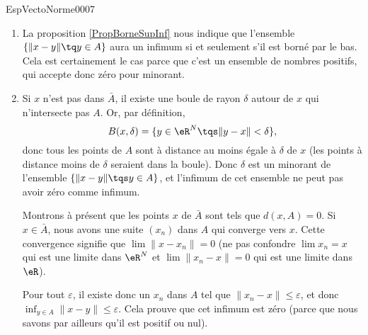 \begin{corrige}{EspVectoNorme0007}

	\begin{enumerate}
		\item
			La proposition \ref{PropBorneSupInf} nous indique que l'ensemble $\{ \| x-y \|\tq
            y\in A \}$ aura un infimum si et seulement s'il est borné par le bas. Cela est certainement le cas parce que c'est un ensemble de nombres positifs, qui accepte donc zéro pour minorant.

		\item
			Si $x$ n'est pas dans $\bar A$, il existe une boule de rayon $\delta$ autour de $x$ qui n'intersecte pas $A$. Or, par définition,
			\begin{equation}
				B(x,\delta)=\{ y\in\eR^N\tqs\| y-x \|<\delta \},
			\end{equation}
			donc tous les points de $A$ sont à distance au moins égale à $\delta$ de $x$ (les points à distance moins de $\delta$ seraient dans la boule). Donc $\delta$ est un minorant de l'ensemble $\{ \| x-y \|\tqs y\in A \}$, et l'infimum de cet ensemble ne peut pas avoir zéro comme infimum.

			Montrons à présent que les points $x$ de $\bar A$ sont tels que $d(x,A)=0$. Si $x\in\bar A$, nous avons une suite $(x_n)$ dans $A$ qui converge vers $x$. Cette convergence signifie que $\lim\| x-x_n \|=0$ (ne pas confondre $\lim x_n=x$ qui est une limite dans $\eR^N$ et $\lim\| x_n-x \|=0$ qui est une limite dans $\eR$).

			Pour tout $\varepsilon$, il existe donc un $x_n$ dans $A$ tel que $\| x_n-x \|\leq\varepsilon$, et donc $\inf_{y\in A}\| x-y \|\leq\varepsilon$. Cela prouve que cet infimum est zéro (parce que nous savons par ailleurs qu'il est positif ou nul).
			
	\end{enumerate}

\end{corrige}
